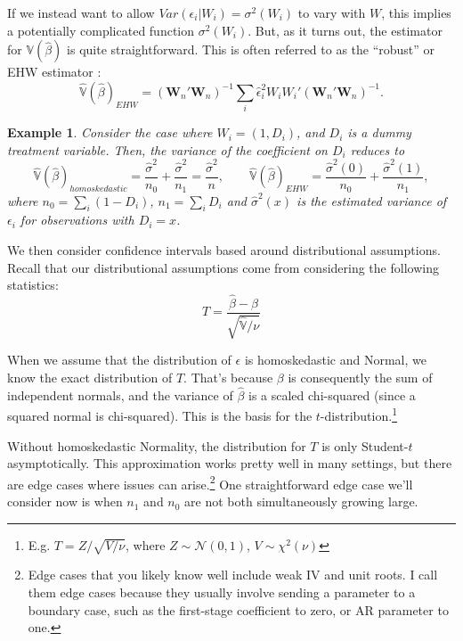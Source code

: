 \documentclass{tufte-handout}
\theoremstyle{break}
\newtheorem{exmp}{Example}
\begin{document}
If we instead want to allow $Var(\epsilon_{i} | W_{i}) = \sigma^{2}(W_{i})$ to vary with $W$, this implies a potentially complicated function $\sigma^{2}(W_{i})$. But, as it turns out, the estimator for $\mathbb{V}(\hat{\beta})$ is quite straightforward. This is often referred to as the ``robust'' or EHW estimator \citep{eicker1963asymptotic, huber1967behavior, white1980heteroskedasticity}:
\begin{equation*}
  \hat{\mathbb{V}}(\hat{\beta})_{EHW} = (\mathbf{W}_{n}'\mathbf{W}_{n})^{-1}\sum_{i}\hat{\epsilon}_{i}^{2}W_{i}W_{i}'(\mathbf{W}_{n}'\mathbf{W}_{n})^{-1}.
\end{equation*}

\begin{boxD}
\begin{exmp}
  \label{exmp:binary}
  Consider the case where $W_{i} = (1, D_{i})$, and $D_{i}$ is a dummy treatment variable. Then, the variance of the coefficient on $D_{i}$ reduces to
\begin{equation*}
       \hat{\mathbb{V}}(\hat{\beta})_{homoskedastic} = \frac{\hat{\sigma}^{2}}{n_{0}} + \frac{\hat{\sigma}^{2}}{n_{1}} = \frac{\hat{\sigma}^{2}}{n}, \qquad \hat{\mathbb{V}}(\hat{\beta})_{EHW} = \frac{\hat{\sigma}^{2}(0)}{n_{0}} + \frac{\hat{\sigma}^{2}(1)}{n_{1}},
     \end{equation*}
where $n_{0} = \sum_{i} (1-D_{i})$, $n_{1} = \sum_{i} D_{i}$ and $\hat{\sigma}^{2}(x)$ is the estimated variance of $\epsilon_{i}$ for observations with $D_{i} = x$. 
    \end{exmp}
  \end{boxD}

We then consider confidence intervals based around distributional assumptions. Recall that our distributional assumptions come from considering the following statistics: 
\begin{equation*}
  T = \frac{\hat{\beta} - \beta}{\sqrt{\hat{\mathbb{V}}/\nu}}
\end{equation*}

When we assume that the distribution of $\epsilon$ is homoskedastic and Normal, we know the exact distribution of $T$. That's because $\beta$ is consequently the sum of independent normals, and the variance of $\hat{\beta}$ is a scaled chi-squared (since a squared normal is chi-squared). This is the basis for the $t$-distribution.\footnote{E.g. $T = Z / \sqrt{V/\nu}$, where $Z \sim \mathcal{N}(0,1)$, $V \sim \chi^{2}(\nu)$}

Without homoskedastic Normality, the distribution for $T$ is only Student-$t$ asymptotically. This approximation works pretty well in many settings, but there are edge cases where issues can arise.\footnote{Edge cases that you likely know well include weak IV and unit roots. I call them edge cases because they usually involve sending a parameter to a boundary case, such as the first-stage coefficient to zero, or AR parameter to one.} One straightforward edge case we'll consider now is when $n_{1}$ and $n_{0}$ are not both simultaneously growing large.
\end{document}
